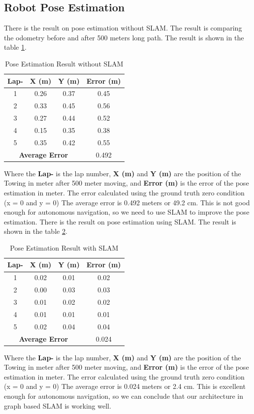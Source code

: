 \documentclass[conference, a4paper]{IEEEtran}[2015/08/26]
\begin{document}
\subsection{Robot Pose Estimation} 
There is the result on pose estimation without SLAM. The result is comparing the odometry before and after 500 meters long path. The result is shown in the table \ref{tab:pose_estimation}.
\begin{table}[H]
	\centering
	\caption{Pose Estimation Result without SLAM}
	\label{tab:pose_estimation}
	\begin{tabular}{|c|c|c|c|}
		\hline
		\textbf{Lap-} & \textbf{X (m)} & \textbf{Y (m)} & \textbf{Error (m)} \\ \hline
		1 & 0.26 & 0.37 & 0.45 \\ \hline
		2 & 0.33 & 0.45 & 0.56 \\ \hline
		3 & 0.27 & 0.44 & 0.52 \\ \hline
		4 & 0.15 & 0.35 & 0.38 \\ \hline
		5 & 0.35 & 0.42 & 0.55 \\ \hline
		\multicolumn{3}{|c|}{\textbf{Average Error}} & 0.492 \\ \hline
	\end{tabular}
\end{table}
Where the \textbf{Lap-} is the lap number, \textbf{X (m)} and \textbf{Y (m)} are the position of the Towing in meter after 500 meter moving, and \textbf{Error (m)} is the error of the pose estimation in meter. The error calculated using the ground truth zero condition (x = 0 and y = 0) The average error is 0.492 meters or 49.2 cm. This is not good enough for autonomous navigation, so we need to use SLAM to improve the pose estimation. There is the result on pose estimation using SLAM. The result is shown in the table \ref{tab:pose_estimation_slam}.
\begin{table}[H]
	\centering
	\caption{Pose Estimation Result with SLAM}
	\label{tab:pose_estimation_slam}
	\begin{tabular}{|c|c|c|c|}
		\hline
		\textbf{Lap-} & \textbf{X (m)} & \textbf{Y (m)} & \textbf{Error (m)} \\ \hline
		1 & 0.02 & 0.01 & 0.02 \\ \hline
		2 & 0.00 & 0.03 & 0.03 \\ \hline
		3 & 0.01 & 0.02 & 0.02 \\ \hline
		4 & 0.01 & 0.01 & 0.01 \\ \hline
		5 & 0.02 & 0.04 & 0.04 \\ \hline
		\multicolumn{3}{|c|}{\textbf{Average Error}} & 0.024 \\ \hline
	\end{tabular}
\end{table}
Where the \textbf{Lap-} is the lap number, \textbf{X (m)} and \textbf{Y (m)} are the position of the Towing in meter after 500 meter moving, and \textbf{Error (m)} is the error of the pose estimation in meter. The error calculated using the ground truth zero condition (x = 0 and y = 0) The average error is 0.024 meters or 2.4 cm. This is excellent enough for autonomous navigation, so we can conclude that our architecture in graph based SLAM is working well.
\end{document}
